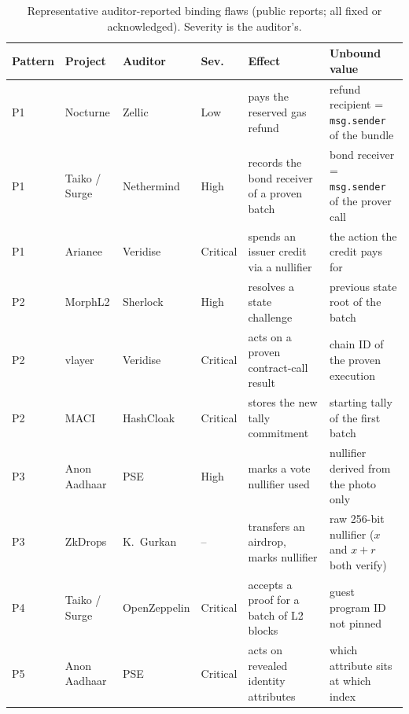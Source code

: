 \begin{table}[!htb]
\centering
\caption{Representative auditor-reported binding flaws (public reports; all
fixed or acknowledged). Severity is the auditor's.}
\label{tab:examples}
\footnotesize
\begin{tabular}{@{}llllp{4.3cm}p{4.6cm}@{}}
\toprule
\textbf{Pattern} & \textbf{Project} & \textbf{Auditor} & \textbf{Sev.} & \textbf{Effect} & \textbf{Unbound value} \\
\midrule
P1 & Nocturne & Zellic & Low & pays the reserved gas refund & refund recipient = \texttt{msg.sender} of the bundle \\
P1 & Taiko / Surge & Nethermind & High & records the bond receiver of a proven batch & bond receiver = \texttt{msg.sender} of the prover call \\
P1 & Arianee & Veridise & Critical & spends an issuer credit via a nullifier & the action the credit pays for \\
P2 & MorphL2 & Sherlock & High & resolves a state challenge & previous state root of the batch \\
P2 & vlayer & Veridise & Critical & acts on a proven contract-call result & chain ID of the proven execution \\
P2 & MACI & HashCloak & Critical & stores the new tally commitment & starting tally of the first batch \\
P3 & Anon Aadhaar & PSE & High & marks a vote nullifier used & nullifier derived from the photo only \\
P3 & ZkDrops & K.\ Gurkan & -- & transfers an airdrop, marks nullifier & raw 256-bit nullifier ($x$ and $x{+}r$ both verify) \\
P4 & Taiko / Surge & OpenZeppelin & Critical & accepts a proof for a batch of L2 blocks & guest program ID not pinned \\
P5 & Anon Aadhaar & PSE & Critical & acts on revealed identity attributes & which attribute sits at which index \\
\bottomrule
\end{tabular}
\end{table}

